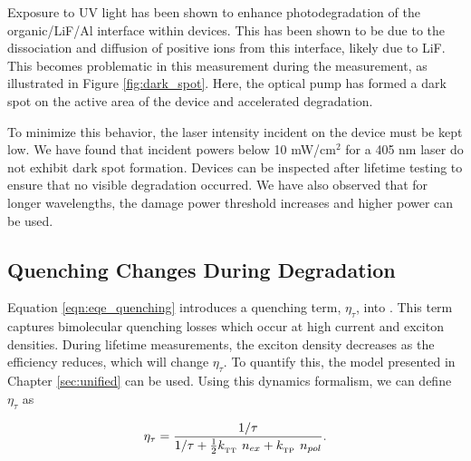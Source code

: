 \documentclass[../thesis.tex]{subfiles}
\begin{document}
Exposure to UV light has been shown to enhance photodegradation of the organic/LiF/Al interface within devices.\supercite{Wang2011a,Wang2010a}
This has been shown to be due to the dissociation and diffusion of positive ions from this interface, likely due to LiF.
This becomes problematic in this measurement during the \pl measurement, as illustrated in Figure \ref{fig:dark_spot}.
Here, the optical pump has formed a dark spot on the active area of the device and accelerated degradation.

To minimize this behavior, the laser intensity incident on the device must be kept low.
We have found that incident powers below 10 mW/cm$^2$ for a 405 nm laser do not exhibit dark spot formation.
Devices can be inspected after lifetime testing to ensure that no visible degradation occurred.  
We have also observed that for longer wavelengths, the damage power threshold increases and higher power can be used.

\subsection{Quenching Changes During Degradation}\label{sec:eta_tau}

Equation \ref{eqn:eqe_quenching} introduces a quenching term, $\eta_\tau$, into \eqe.  
This term captures bimolecular quenching losses which occur at high current and exciton densities.
During lifetime measurements, the exciton density decreases as the efficiency reduces, which will change $\eta_\tau$.
To quantify this, the model presented in Chapter \ref{sec:unified} can be used.
Using this dynamics formalism, we can define $\eta_\tau$ as

\begin{equation}
\eta_\tau=\frac{1/\tau}{1/\tau+\frac{1}{2}k_{_\text{\tiny TT}}\  n_{ex} +k_{_\text{\tiny TP}}\  n_{pol}}.
\label{eqn:eta_tau}
\end{equation}
\end{document}

